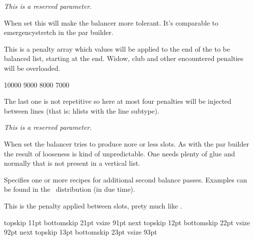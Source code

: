 {\em This is a reserved parameter.}

\stopnewprimitive

\startnewprimitive[title={\prm {balanceemergencystretch}}]

When set this will make the balancer more tolerant. It's comparable to \prm
{emergencystretch} in the par builder.

\stopnewprimitive

\startnewprimitive[title={\prm {balancefinalpenalties}}]

This is a penalty array which values will be applied to the end of the to be
balanced list, starting at the end. Widow, club and other encountered penalties
will be overloaded.

\starttyping
{}
    10000 9000 8000 7000
\relax
\stoptyping

The last one is not repetitive so here at most four penalties will be injected
between lines (that is: hlists with the line subtype).

\stopnewprimitive

\startnewprimitive[title={\prm {balancelineheight}}]

{\em This is a reserved parameter.}

\stopnewprimitive

\startnewprimitive[title={\prm {balancelooseness}}]

When set the balancer tries to produce nore or less slots. As with the par
builder the result of looseness is kind of unpredictable. One needs plenty of
glue and normally that is not present in a vertical list.

\stopnewprimitive

\startnewprimitive[title={\prm {balancepasses}}]

Specifies one or more recipes for additional second balance passes. Examples
can be found in the \CONTEXT\ distribution (in due time).

\stopnewprimitive

\startnewprimitive[title={\prm {balancepenalty}}]

This is the penalty applied between slots, prety much like .

\stopnewprimitive

\startnewprimitive[title={\prm {balanceshape}}]

\startbuffer[shape]
    topskip 11pt bottomskip 21pt vsize 91pt next
    topskip 12pt bottomskip 22pt vsize 92pt next
    topskip 13pt bottomskip 23pt vsize 93pt
\relax
\stopbuffer

